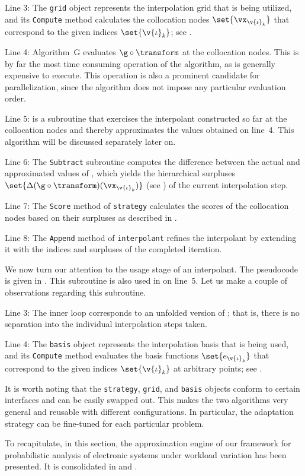 Line 3: The \texttt{grid} object represents the interpolation grid that is being
utilized, and its \texttt{Compute} method calculates the collocation nodes
$\set{\vx_{\v{\iota}_k}}$ that correspond to the given indices
$\set{\v{\iota}_k}$; see .

Line 4: Algorithm~G evaluates $\g \circ \transform$ at the collocation nodes.
This is by far the most time consuming operation of the algorithm, as \g is
generally expensive to execute. This operation is also a prominent candidate for
parallelization, since the algorithm does not impose any particular evaluation
order.

Line 5:  is a subroutine that exercises the interpolant
constructed so far at the collocation nodes and thereby approximates the values
obtained on line~4. This algorithm will be discussed separately later on.

Line 6: The \texttt{Subtract} subroutine computes the difference between the
actual and approximated values of \g, which yields the hierarchical surpluses
$\set{\Delta(\g \circ \transform)(\vx_{\v{\iota}_k})}$ (see
) of the current interpolation step.

Line 7: The \texttt{Score} method of \texttt{strategy} calculates the scores of
the collocation nodes based on their surpluses as described in
.

Line 8: The \texttt{Append} method of \texttt{interpolant} refines the
interpolant by extending it with the indices and surpluses of the completed
iteration.

We now turn our attention to the usage stage of an interpolant. The pseudocode
is given in . This subroutine is also used in
 on line~5. Let us make a couple of observations
regarding this subroutine.

Line 3: The inner loop corresponds to an unfolded version of
; that is, there is no separation into the individual
interpolation steps taken.

Line 4: The \texttt{basis} object represents the interpolation basis that is
being used, and its \texttt{Compute} method evaluates the basis functions
$\set{e_{\v{\iota}_k}}$ that correspond to the given indices $\set{\v{\iota}_k}$
at arbitrary points; see .

It is worth noting that the \texttt{strategy}, \texttt{grid}, and \texttt{basis}
objects conform to certain interfaces and can be easily swapped out. This makes
the two algorithms very general and reusable with different configurations. In
particular, the adaptation strategy can be fine-tuned for each particular
problem.

\conclusioncut
To recapitulate, in this section, the approximation engine of our framework for
probabilistic analysis of electronic systems under workload variation has been
presented. It is consolidated in  and
.
